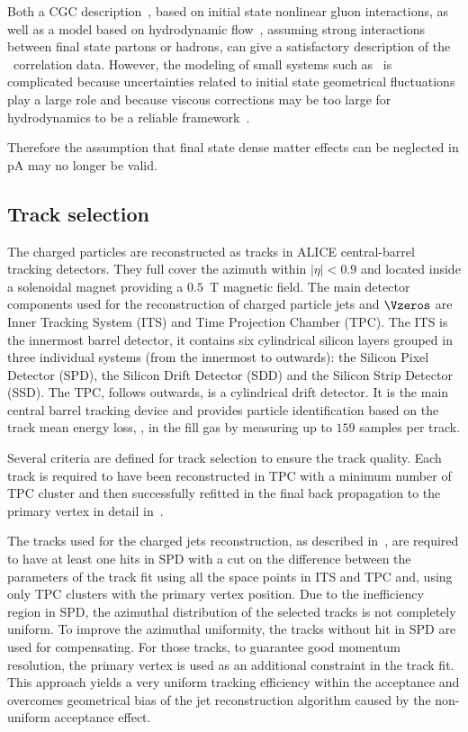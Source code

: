 Both a CGC
description~\cite{Dusling:2013oia}, based on initial state nonlinear
gluon interactions, as well as a model based on hydrodynamic
flow~\cite{Bozek:2012gr,Qin:2013bha}, assuming strong interactions
between final state partons or hadrons, can give a satisfactory
description of the \pPb\ correlation data. However, the modeling of
small systems such as \pPb\ is complicated because uncertainties
related to initial state geometrical fluctuations play a large role
and because viscous corrections may be too large for hydrodynamics to
be a reliable framework~\cite{Bzdak:2013zma}.


Therefore the assumption that final state dense matter effects can be
neglected in pA may no longer be valid.  


\subsection{Track selection}

The charged particles are reconstructed as tracks in ALICE central-barrel tracking detectors. They full cover the azimuth within $|\eta|<0.9$ and located inside a solenoidal magnet providing a $0.5$~T magnetic field.
The main detector components used for the reconstruction of charged particle
jets and $\Vzeros$ are Inner Tracking System (ITS) and
Time Projection Chamber (TPC).
The ITS is the innermost barrel detector,
it contains six cylindrical silicon layers grouped in three
individual systems (from the innermost to outwards):
the Silicon Pixel Detector (SPD),
the Silicon Drift Detector (SDD) and
the Silicon Strip Detector (SSD).
The TPC, follows outwards, is a cylindrical drift detector.
It is the main central barrel tracking device and provides
particle identification based on the track mean energy loss, \dedx, 
in the fill gas by measuring up to $159$ samples per track.

Several criteria are defined for track selection to ensure the track quality.
Each track is required to have been reconstructed in TPC with a minimum
number of TPC cluster and then successfully refitted in the final back propagation
to the primary vertex in detail in~\cite{Alessandro:2006yt}.

The tracks used for the charged jets reconstruction,
as described in~\cite{Abelev:2013kqa},
are required to have at least one hits in SPD with a cut on
the difference between the parameters of the track fit using
all the space points in ITS and TPC and, using only TPC clusters 
with the primary vertex position.
Due to the inefficiency region in SPD,
the azimuthal distribution of the selected tracks is not completely uniform.
To improve the azimuthal uniformity,
the tracks without hit in SPD are used for compensating.
For those tracks, to guarantee good momentum resolution,
the primary vertex is used as an additional constraint in the track fit.
This approach yields a very uniform tracking efficiency within
the acceptance and overcomes geometrical bias of the jet reconstruction
algorithm caused by the non-uniform acceptance effect.

